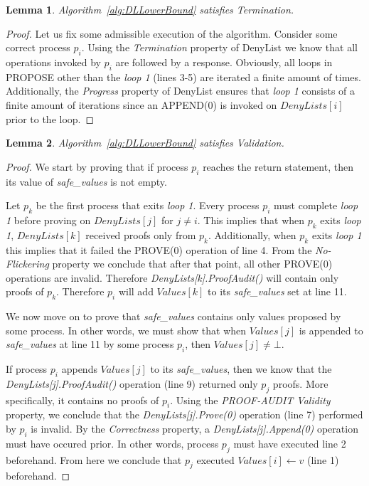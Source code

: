 \documentclass[11pt]{article}
\newtheorem{lemma}{Lemma}
\theoremstyle{definition}
\begin{document}
\begin{lemma}
  Algorithm~\ref{alg:DLLowerBound} satisfies Termination.
\end{lemma}
\begin{proof}
Let us fix some admissible execution of the algorithm. Consider some correct process $p_i$. Using the \textit{Termination} property of DenyList we know that all operations invoked by $p_i$ are followed by a response. Obviously, all loops in PROPOSE other than the \textit{loop 1} (lines 3-5) are iterated a finite amount of times. Additionally, the \textit{Progress} property of DenyList ensures that \textit{loop 1} consists of a finite amount of iterations since an APPEND(0) is invoked on $DenyLists[i]$ prior to the loop.
\end{proof}
\begin{lemma}
  Algorithm~\ref{alg:DLLowerBound} satisfies Validation.
\end{lemma}
\begin{proof}
We start by proving that if process $p_i$ reaches the return statement, then its value of \textit{safe\_values} is not empty. 

Let $p_k$ be the first process that exits \textit{loop 1}. Every process $p_i$ must complete \textit{loop 1} before proving on $DenyLists[j]$ for $j\neq i$. This implies that when $p_k$ exits \textit{loop 1}, $DenyLists[k]$ received proofs only from $p_k$. Additionally, when $p_k$ exits \textit{loop 1} this implies that it failed the PROVE(0) operation of line 4. From the \textit{No-Flickering} property we conclude that after that point, all other PROVE(0) operations are invalid. Therefore \textit{DenyLists[k].ProofAudit()} will contain only proofs of $p_k$. Therefore $p_i$ will add $Values[k]$ to its \textit{safe\_values} set at line 11.

We now move on to prove that \textit{safe\_values} contains only values proposed by some process. In other words, we must show that when $Values[j]$ is appended to \textit{safe\_values} at line 11 by some process $p_i$, then $Values[j] \neq \bot$.

If process $p_i$ appends $Values[j]$ to its \textit{safe\_values}, then we know that the \textit{DenyLists[j].ProofAudit()} operation (line 9) returned only $p_j$ proofs. More specifically, it contains no proofs of $p_i$. Using the \textit{PROOF-AUDIT Validity} property, we conclude that the \textit{DenyLists[j].Prove(0)} operation (line 7) performed by $p_i$ is invalid. By the \textit{Correctness} property, a \textit{DenyLists[j].Append(0)} operation must have occured prior. In other words, process $p_j$ must have executed line 2 beforehand. From here we conclude that $p_j$ executed $Values[i] \leftarrow v$ (line 1) beforehand.
    
\end{proof}
\end{document}
